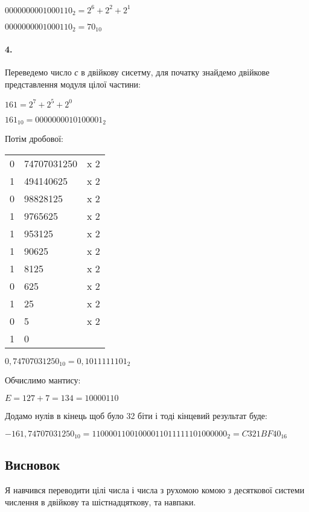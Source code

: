 \documentclass[12pt]{extarticle}
\begin{document}
$0000000001000110_2 = 2^6 + 2^2 + 2^1$

$0000000001000110_2 = 70_{10}$


\paragraph{4.}
Переведемо число \textit{с} в двійкову сисетму, 
для початку знайдемо двійкове представлення модуля цілої частини:

$161 = 2^7 + 2^5 + 2^0$

$161_{10} = 0000000010100001_2$

\vspace{12pt}
Потім дробової:
\begin{center}
    \begin{tabular}{ c | l c}
    0 & 74707031250 & x 2\\
    1 & 494140625 & x 2\\
    0 & 98828125 & x 2\\
    1 & 9765625 & x 2\\
    1 & 953125 & x 2\\
    1 & 90625 & x 2\\
    1 & 8125 & x 2\\
    0 & 625 & x 2\\
    1 & 25 & x 2\\
    0 & 5 & x 2\\
    1 & 0
    \end{tabular}
\end{center}

$0,74707031250_{10} = 0,1011111101_2$
\vspace{12pt}

Обчислимо мантису:

$E = 127 + 7 = 134 = 10000110$

\vspace{12pt}
Додамо нулів в кінець щоб було 32 біти і тоді кінцевий результат буде:

$-161,74707031250_{10} = 1 10000110 01000011011111101000000_2 = C321BF40_{16}$

\subsection*{Висновок}

Я навчився переводити цілі числа і числа з рухомою комою з десяткової
системи числення в двійкову та шістнадцяткову, та навпаки.
\end{document}
